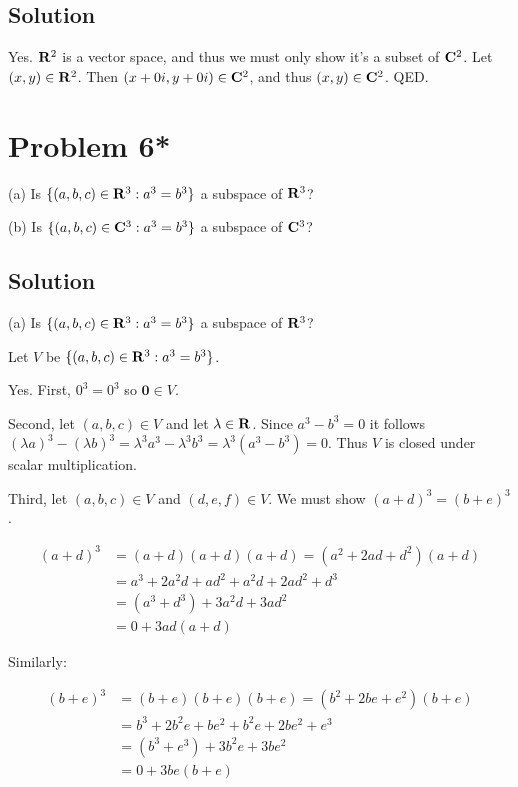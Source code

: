 \documentclass{article}
\begin{document}
\subsection*{Solution}

Yes. $\mathbf{R}^2$ is a vector space, and thus we must only show it's a subset of $\mathbf{C}^2$. Let $(x, y)\in\mathbf{R}^2$. Then $(x+0i, y+0i)\in\mathbf{C}^2$, and thus $(x, y)\in\mathbf{C}^2$. QED.

\newpage

\section*{Problem 6*}
(a) \qquad Is $\{(a, b, c)\in\mathbf{R}^3:a^3=b^3\}$ a subspace of $\mathbf{R}^3$?

(b) \qquad Is $\{(a, b, c)\in\mathbf{C}^3:a^3=b^3\}$ a subspace of $\mathbf{C}^3$?

\subsection*{Solution}
(a) \qquad Is $\{(a, b, c)\in\mathbf{R}^3:a^3=b^3\}$ a subspace of $\mathbf{R}^3$?

Let $V$ be $\{(a, b, c)\in\mathbf{R}^3:a^3=b^3\}$.

\vs

Yes. First, $0^3=0^3$ so $\mathbf{0}\in V$.

\vs

Second, let $(a, b, c)\in V$ and let $\lambda\in \mathbf{R}$. Since $a^3-b^3=0$ it follows $(\lambda a)^3 - (\lambda b)^3=\lambda^3 a^3 - \lambda^3 b^3=\lambda^3(a^3-b^3)=0$. Thus $V$ is closed under scalar multiplication.

\vs

Third, let $(a, b, c)\in V$ and $(d, e, f)\in V$. We must show $(a + d)^3=(b+e)^3$.

\begin{align*}
    (a+d)^3&=(a+d)(a+d)(a+d)=(a^2 + 2ad + d^2)(a+d)\\
    &= a^3 + 2a^2d + ad^2 + a^2d + 2ad^2 + d^3\\
    &= (a^3 + d^3) + 3a^2d + 3ad^2\\
    &= 0 + 3ad(a + d)
\end{align*}

Similarly:

\begin{align*}
    (b+e)^3&=(b+e)(b+e)(b+e)=(b^2 + 2be + e^2)(b+e)\\
    &= b^3 + 2b^2e + be^2 + b^2e + 2be^2 + e^3\\
    &= (b^3 + e^3) + 3b^2e + 3be^2\\
    &= 0 + 3be(b + e)
\end{align*}
\end{document}
